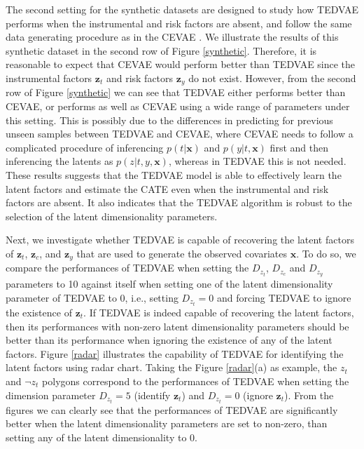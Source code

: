 \documentclass[letterpaper]{article} %
\begin{document}
The second setting for the synthetic datasets are designed to study how TEDVAE performs when the instrumental and risk factors are absent, and follow the same data generating procedure as in the CEVAE \cite{Louizos2017}.
We illustrate the results of this synthetic dataset in the second row of Figure \ref{synthetic}. Therefore, it is reasonable to expect that CEVAE would perform better than TEDVAE since the instrumental factors $\mathbf{z}_t$ and risk factors $\mathbf{z}_y$ do not exist.
However, from the second row of Figure \ref{synthetic} we can see that TEDVAE either performs better than  CEVAE, or performs as well as CEVAE using a wide range of parameters under this setting.
This is possibly due to the differences in predicting for previous unseen samples between TEDVAE and CEVAE, where CEVAE needs to follow a complicated procedure of inferencing $p(t|\mathbf{x})$ and $p(y|t,\mathbf{x})$ first and then inferencing the latents as $p(z|t,y,\mathbf{x})$, whereas in TEDVAE this is not needed.
These results suggests that the TEDVAE model is able to effectively learn the latent factors and estimate the CATE even when the instrumental and risk factors are absent. It also indicates that the TEDVAE algorithm is robust to the selection of the latent dimensionality parameters.


Next, we investigate whether TEDVAE is capable of recovering the latent factors of $\mathbf{z}_t$, $\mathbf{z}_c$, and $\mathbf{z}_y$ that are used to generate the observed covariates $\mathbf{x}$. To do so, we compare the performances of TEDVAE when setting the $D_{z_t}$, $D_{z_c}$ and $D_{z_y}$ parameters to 10 against itself when setting one of the latent dimensionality parameter of TEDVAE to $0$, i.e., setting $D_{z_t}=0$ and forcing TEDVAE to ignore the existence of $\mathbf{z}_t$. If TEDVAE is indeed capable of recovering the latent factors, then its performances with non-zero latent dimensionality parameters should be better than its performance when ignoring the existence of any of the latent factors.
Figure \ref{radar} illustrates the capability of TEDVAE for identifying the latent factors using radar chart. Taking the Figure \ref{radar}(a) as example, the $z_t$ and $\neg z_t$ polygons correspond to the performances of TEDVAE when setting the dimension parameter $D_{z_t}=5$ (identify $\mathbf{z}_t$) and $D_{z_t}=0$ (ignore $\mathbf{z}_t$). From the figures we can clearly see that the performances of TEDVAE are significantly better when the latent dimensionality parameters are set to non-zero, than setting any of the latent dimensionality to 0.
\end{document}
